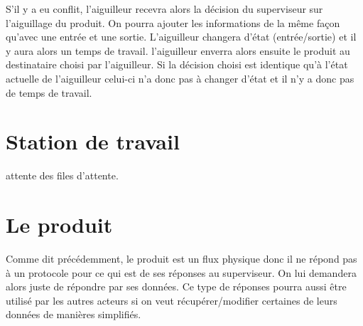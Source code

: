 	S'il y a eu conflit, l'aiguilleur recevra alors la décision du superviseur sur l'aiguillage du produit. On pourra ajouter les informations de la même façon qu'avec une entrée et une sortie. L'aiguilleur changera d'état (entrée/sortie) et il y aura alors un temps de travail. l'aiguilleur enverra alors ensuite le produit au destinataire choisi par l'aiguilleur. Si la décision choisi est identique qu'à l'état actuelle de l'aiguilleur celui-ci n'a donc pas à changer d'état et il n'y a donc pas de temps de travail.
	
	\section{Station de travail}
	attente des files d'attente. 
	 
	 \section{Le produit}
	 Comme dit précédemment, le produit est un flux physique donc il ne répond pas à un protocole pour ce qui est de ses réponses au superviseur. On lui demandera alors juste de répondre par ses données. Ce type de réponses pourra aussi être utilisé par les autres acteurs si on veut récupérer/modifier certaines de leurs données de manières simplifiés.
	 
